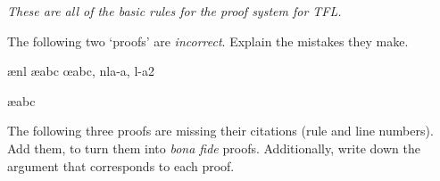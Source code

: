 \emph{These are all of the basic rules for the proof system for TFL.}

\practiceproblems

\problempart
The following two `proofs' are \emph{incorrect}. Explain the mistakes they make.
\begin{fitchproof}
\open
{}
\ae{nl}
	\ae{abc}
\close
\open
\close
{}\oe{abc, nla-a, l-a2}
\end{fitchproof}

\begin{fitchproof}
\ae{abc}
\end{fitchproof}

\problempart
The following three proofs are missing their citations (rule and line numbers). Add them, to turn them into \emph{bona fide} proofs. Additionally, write down the argument that corresponds to each proof.
\begin{multicols}{2}
\begin{fitchproof}
\end{fitchproof}

\begin{fitchproof}
\open
\close
{}%
\end{fitchproof}

\begin{fitchproof}
\open
\close
\open
\close
{}%
\end{fitchproof}
\end{multicols}

